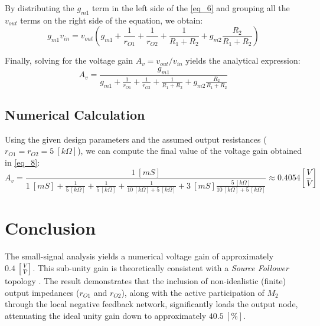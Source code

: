 \documentclass[12pt,a4paper]{article}
\begin{document}
By distributing the $g_{m1}$ term in the left side of the \autoref{eq_6} and grouping all the $v_{out}$ terms on the right side of the equation, we obtain:
\begin{equation}
    g_{m1}v_{in} = v_{out} \left( g_{m1} + \frac{1}{r_{O1}} + \frac{1}{r_{O2}} + \frac{1}{R_{1} + R_{2}} + g_{m2} \frac{R_{2}}{R_{1} + R_{2}} \right)
    \label{eq_7}
\end{equation}

Finally, solving for the voltage gain $A_{v} = v_{out}/v_{in}$ yields the analytical expression:
\begin{equation}
    A_{v} = \frac{g_{m1}}{g_{m1} + \frac{1}{r_{O1}} + \frac{1}{r_{O2}} + \frac{1}{R_{1} + R_{2}} + g_{m2} \frac{R_{2}}{R_{1} + R_{2}}}
    \label{eq_8}
\end{equation}


\subsection{Numerical Calculation}
Using the given design parameters and the assumed output resistances ($r_{O1} = r_{O2} = 5 \ [k\Omega]$), we can compute the final value of the voltage gain obtained in \autoref{eq_8}:
\begin{equation}
    A_{v} = \frac{1 \ [mS]}{1 \ [mS] + \frac{1}{5 \ [k\Omega]} + \frac{1}{5 \ [k\Omega]} + \frac{1}{10 \ [k\Omega] + 5 \ [k\Omega]} + 3 \ [mS] \frac{5 \ [k\Omega]}{10 \ [k\Omega] + 5 \ [k\Omega]}} \approx 0.4054 \left[ \frac{V}{V} \right]
    \label{eq_9}
\end{equation}



\section{Conclusion}
The small-signal analysis yields a numerical voltage gain of approximately $0.4 \ \left[\frac{V}{V}\right]$. This sub-unity gain is theoretically consistent with a \textit{Source Follower} topology \cite[p. 332]{b1}. The result demonstrates that the inclusion of non-idealistic (finite) output impedances ($r_{O1}$ and $r_{O2}$), along with the active participation of $M_{2}$ through the local negative feedback network, significantly loads the output node, attenuating the ideal unity gain down to approximately $40.5 \ [\%]$.

\newpage
\printbibliography[heading=bibintoc, title={4 \, \, Bibliography}]
\end{document}
